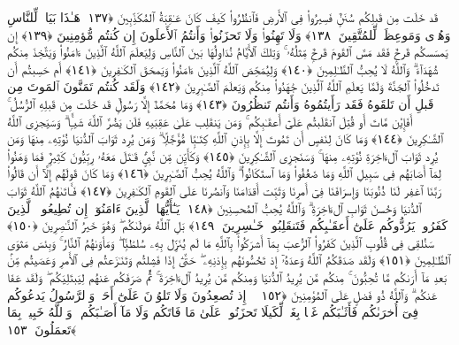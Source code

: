  قَد خَلَت مِن قَبلِكُم سُنَنٌۭ فَسِيرُوا۟ فِى ٱلأَرضِ فَٱنظُرُوا۟ كَيفَ كَانَ عَـٰقِبَةُ ٱلمُكَذِّبِينَ ﴿١٣٧﴾
 هَـٰذَا بَيَانٌۭ لِّلنَّاسِ وَهُدًۭى وَمَوعِظَةٌۭ لِّلمُتَّقِينَ ﴿١٣٨﴾
 وَلَا تَهِنُوا۟ وَلَا تَحزَنُوا۟ وَأَنتُمُ ٱلأَعلَونَ إِن كُنتُم مُّؤمِنِينَ ﴿١٣٩﴾
 إِن يَمسَسكُم قَرحٌۭ فَقَد مَسَّ ٱلقَومَ قَرحٌۭ مِّثلُهُۥ ۚ وَتِلكَ ٱلأَيَّامُ نُدَاوِلُهَا بَينَ ٱلنَّاسِ وَلِيَعلَمَ ٱللَّهُ ٱلَّذِينَ ءَامَنُوا۟ وَيَتَّخِذَ مِنكُم شُهَدَآءَ ۗ وَٱللَّهُ لَا يُحِبُّ ٱلظَّـٰلِمِينَ ﴿١٤٠﴾
 وَلِيُمَحِّصَ ٱللَّهُ ٱلَّذِينَ ءَامَنُوا۟ وَيَمحَقَ ٱلكَـٰفِرِينَ ﴿١٤١﴾
 أَم حَسِبتُم أَن تَدخُلُوا۟ ٱلجَنَّةَ وَلَمَّا يَعلَمِ ٱللَّهُ ٱلَّذِينَ جَٰهَدُوا۟ مِنكُم وَيَعلَمَ ٱلصَّـٰبِرِينَ ﴿١٤٢﴾
 وَلَقَد كُنتُم تَمَنَّونَ ٱلمَوتَ مِن قَبلِ أَن تَلقَوهُ فَقَد رَأَيتُمُوهُ وَأَنتُم تَنظُرُونَ ﴿١٤٣﴾
 وَمَا مُحَمَّدٌ إِلَّا رَسُولٌۭ قَد خَلَت مِن قَبلِهِ ٱلرُّسُلُ ۚ أَفَإِي۟ن مَّاتَ أَو قُتِلَ ٱنقَلَبتُم عَلَىٰٓ أَعقَـٰبِكُم ۚ وَمَن يَنقَلِب عَلَىٰ عَقِبَيهِ فَلَن يَضُرَّ ٱللَّهَ شَيـًۭٔا ۗ وَسَيَجزِى ٱللَّهُ ٱلشَّـٰكِرِينَ ﴿١٤٤﴾
 وَمَا كَانَ لِنَفسٍ أَن تَمُوتَ إِلَّا بِإِذنِ ٱللَّهِ كِتَـٰبًۭا مُّؤَجَّلًۭا ۗ وَمَن يُرِد ثَوَابَ ٱلدُّنيَا نُؤتِهِۦ مِنهَا وَمَن يُرِد ثَوَابَ ٱلءَاخِرَةِ نُؤتِهِۦ مِنهَا ۚ وَسَنَجزِى ٱلشَّـٰكِرِينَ ﴿١٤٥﴾
 وَكَأَيِّن مِّن نَّبِىٍّۢ قَـٰتَلَ مَعَهُۥ رِبِّيُّونَ كَثِيرٌۭ فَمَا وَهَنُوا۟ لِمَآ أَصَابَهُم فِى سَبِيلِ ٱللَّهِ وَمَا ضَعُفُوا۟ وَمَا ٱستَكَانُوا۟ ۗ وَٱللَّهُ يُحِبُّ ٱلصَّـٰبِرِينَ ﴿١٤٦﴾
 وَمَا كَانَ قَولَهُم إِلَّآ أَن قَالُوا۟ رَبَّنَا ٱغفِر لَنَا ذُنُوبَنَا وَإِسرَافَنَا فِىٓ أَمرِنَا وَثَبِّت أَقدَامَنَا وَٱنصُرنَا عَلَى ٱلقَومِ ٱلكَـٰفِرِينَ ﴿١٤٧﴾
 فَـَٔاتَىٰهُمُ ٱللَّهُ ثَوَابَ ٱلدُّنيَا وَحُسنَ ثَوَابِ ٱلءَاخِرَةِ ۗ وَٱللَّهُ يُحِبُّ ٱلمُحسِنِينَ ﴿١٤٨﴾
 يَـٰٓأَيُّهَا ٱلَّذِينَ ءَامَنُوٓا۟ إِن تُطِيعُوا۟ ٱلَّذِينَ كَفَرُوا۟ يَرُدُّوكُم عَلَىٰٓ أَعقَـٰبِكُم فَتَنقَلِبُوا۟ خَـٰسِرِينَ ﴿١٤٩﴾
 بَلِ ٱللَّهُ مَولَىٰكُم ۖ وَهُوَ خَيرُ ٱلنَّـٰصِرِينَ ﴿١٥٠﴾
 سَنُلقِى فِى قُلُوبِ ٱلَّذِينَ كَفَرُوا۟ ٱلرُّعبَ بِمَآ أَشرَكُوا۟ بِٱللَّهِ مَا لَم يُنَزِّل بِهِۦ سُلطَٰنًۭا ۖ وَمَأوَىٰهُمُ ٱلنَّارُ ۚ وَبِئسَ مَثوَى ٱلظَّـٰلِمِينَ ﴿١٥١﴾
 وَلَقَد صَدَقَكُمُ ٱللَّهُ وَعدَهُۥٓ إِذ تَحُسُّونَهُم بِإِذنِهِۦ ۖ حَتَّىٰٓ إِذَا فَشِلتُم وَتَنَـٰزَعتُم فِى ٱلأَمرِ وَعَصَيتُم مِّنۢ بَعدِ مَآ أَرَىٰكُم مَّا تُحِبُّونَ ۚ مِنكُم مَّن يُرِيدُ ٱلدُّنيَا وَمِنكُم مَّن يُرِيدُ ٱلءَاخِرَةَ ۚ ثُمَّ صَرَفَكُم عَنهُم لِيَبتَلِيَكُم ۖ وَلَقَد عَفَا عَنكُم ۗ وَٱللَّهُ ذُو فَضلٍ عَلَى ٱلمُؤمِنِينَ ﴿١٥٢﴾
 ۞ إِذ تُصعِدُونَ وَلَا تَلوُۥنَ عَلَىٰٓ أَحَدٍۢ وَٱلرَّسُولُ يَدعُوكُم فِىٓ أُخرَىٰكُم فَأَثَـٰبَكُم غَمًّۢا بِغَمٍّۢ لِّكَيلَا تَحزَنُوا۟ عَلَىٰ مَا فَاتَكُم وَلَا مَآ أَصَـٰبَكُم ۗ وَٱللَّهُ خَبِيرٌۢ بِمَا تَعمَلُونَ ﴿١٥٣﴾

